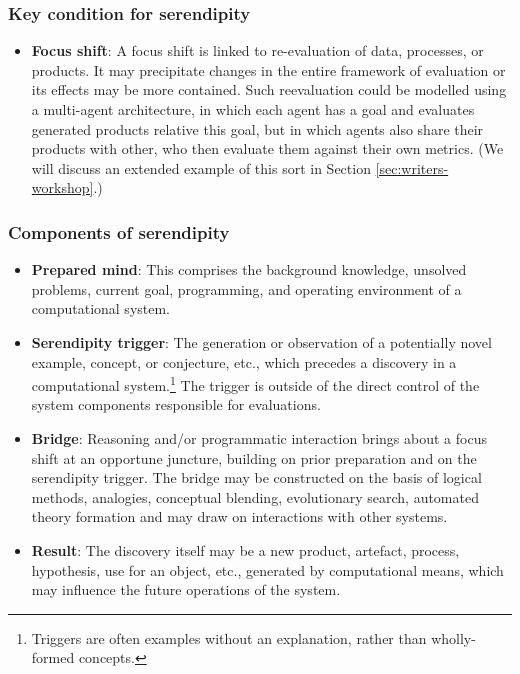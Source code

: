 \documentclass{llncs}
\begin{document}
\newpage
\subsubsection*{Key condition for serendipity}

\begin{itemize}
\item \textbf{Focus shift}: A focus shift is linked to re-evaluation
  of data, processes, or products.  It may precipitate changes in the
  entire framework of evaluation or its effects may be more contained.
  Such reevaluation could be modelled using a multi-agent
  architecture, in which each agent has a goal and evaluates generated
  products relative this goal, but in which agents also share their
  products with other, who then evaluate them against their own
  metrics.  (We will discuss an extended example of this sort in
  Section \ref{sec:writers-workshop}.)
\end{itemize}

\subsubsection*{Components of serendipity}

\begin{itemize}
\item \textbf{Prepared mind}: This comprises the background knowledge,
  unsolved problems, current goal, programming, and operating
  environment of a computational system.
\item \textbf{Serendipity trigger}: The generation or observation of a
  potentially novel example, concept, or conjecture, etc., which
  precedes a discovery in a computational system.\footnote{Triggers
    are often examples without an explanation, rather than
    wholly-formed concepts.}  The trigger is outside of the direct
  control of the system components responsible for evaluations.
\item \textbf{Bridge}: Reasoning and/or programmatic interaction
  brings about a focus shift at an opportune juncture, building on
  prior preparation and on the serendipity trigger.  The bridge may be
  constructed on the basis of logical methods, analogies, conceptual
  blending, evolutionary search, automated theory formation and may
  draw on interactions with other systems.
\item \textbf{Result}: The discovery itself may be a new product,
  artefact, process, hypothesis, use for an object, etc., generated by
  computational means, which may influence the future operations of
  the system.
\end{itemize}
\end{document}

